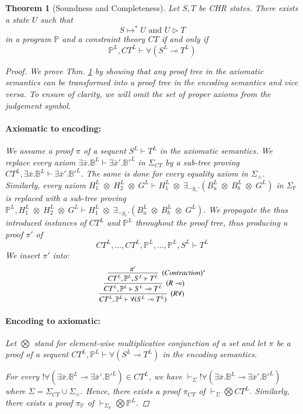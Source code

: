 \documentclass[acmtocl]{acmtrans2m}
\newtheorem{theorem}{Theorem}[section]
\newcommand\ent{\rhd}
\newcommand{\bbP}{\ensuremath{\mathbb{P}}}
\newcommand{\B}{\ensuremath{\mathbb{B}}}
\newcommand{\Sct}{\ensuremath{\Sigma_{CT}}}
\newcommand{\Seq}{\ensuremath{\Sigma_{\doteq}}}
\newcommand{\Sp}{\ensuremath{\Sigma_\mathbb{P}}}
\newcommand{\by}{\bar{y}}
\newcommand{\bx}{\bar{x}}
\newcommand{\x}{{\;\otimes\;}}
\newcommand{\lp}{\multimap}
\begin{document}
\begin{theorem}[Soundness and Completeness]
  \label{theorem:embed_soundness_completeness}
  Let $S,T$ be CHR states. There exists a state $U$ such that
  \[
    S\mapsto^{*}U\textrm{ and }U\ent T
  \]
  in a program $\bbP$ and a constraint theory $CT$ \emph{if and only if}
  \[
    \bbP^L,CT^L \vdash \forall(S^L\lp T^L)
  \]
\begin{proof}
  We prove Thm. \ref{theorem:embed_soundness_completeness} by showing that any
  proof tree in the axiomatic semantics can be transformed into a proof tree in
  the encoding semantics and vice versa. To ensure of clarity, we will omit
  the set of proper axioms from the judgement symbol.

  \paragraph*{Axiomatic to encoding:} We assume a proof $\pi$ of a sequent
  $S^L\vdash T^L$ in the axiomatic semantics. We replace
  every axiom $\exists\bx.\B^L\vdash\exists\bx'.{\B'}^L$ in $\Sct$ by a sub-tree proving
  $CT^L,\exists\bx.\B^L\vdash\exists\bx'.{\B'}^L$. The same is done for every
  equality axiom in $\Seq$. Similarly, every axiom $H^L_1\x H^L_2\x G^L\vdash
  H^L_1\x\exists_{-\by_r}.(B^L_u\x B^L_b\x G^L)$ in $\Sp$ is replaced with a
  sub-tree proving $\bbP^L, H^L_1\x H^L_2\x G^L\vdash
  H^L_1\x\exists_{-\by_r}.(B^L_u\x B^L_b\x G^L)$. We propagate the thus
  introduced instances of $CT^L$ and $\bbP^L$ throughout the proof tree, thus
  producing a proof $\pi'$ of
  \[
  	CT^L,\ldots,CT^L,\bbP^L,\ldots,\bbP^L,S^L\vdash T^L
  \]
  We insert $\pi'$ into:
  \[
  	\small
  	\infer[(R\forall)]
  	{
	  	CT^L,\bbP^L\vdash \forall(S^L\lp T^L)
  	}
  	{
  		\infer[(R\lp)]
  		{
  			CT^L,\bbP^L\vdash S^L\lp T^L
  		}
  		{
  			\infer[(Contraction)^*]
  			{
  				CT^L,\bbP^L,S^L\vdash T^L
  			}
  			{
  				\pi'
  			}
  		}
  	}
  \]

  \paragraph*{Encoding to axiomatic:} Let $\bigotimes$ stand for element-wise
  multiplicative conjunction of a set and let $\pi$ be a proof of a sequent
  $CT^L,\bbP^L\vdash \forall(S^L\lp T^L)$ in the encoding semantics.

  For every $!\forall(\exists\bx.{\B}^L\lp \exists\bx'.{\B'}^L)\in CT^L$, we
  have $\vdash_\Sigma !\forall(\exists\bx.{\B}^L\lp \exists\bx'.{\B'}^L)$ where
  $\Sigma=\Sct\cup\Seq$. Hence, there exists a proof $\pi_{CT}$ of
  $\vdash_\Sigma \bigotimes CT^L$. Similarly, there exists a proof $\pi_{\bbP}$
  of $\vdash_{\Sp} \bigotimes \bbP^L$.


\end{proof}
\end{theorem}
\end{document}
